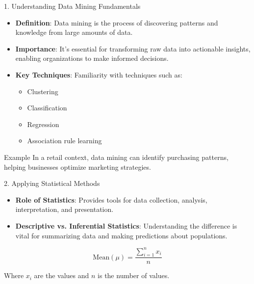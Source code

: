 \documentclass[aspectratio=169]{beamer}
\begin{document}
\begin{frame}[fragile]{1. Understanding Data Mining Fundamentals}
    \begin{itemize}
        \item \textbf{Definition}: Data mining is the process of discovering patterns and knowledge from large amounts of data.
        \item \textbf{Importance}: It's essential for transforming raw data into actionable insights, enabling organizations to make informed decisions.
        \item \textbf{Key Techniques}: Familiarity with techniques such as:
            \begin{itemize}
                \item Clustering
                \item Classification
                \item Regression
                \item Association rule learning
            \end{itemize}
    \end{itemize}
    
    \begin{block}{Example}
        In a retail context, data mining can identify purchasing patterns, helping businesses optimize marketing strategies.
    \end{block}
\end{frame}

\begin{frame}[fragile]{2. Applying Statistical Methods}
    \begin{itemize}
        \item \textbf{Role of Statistics}: Provides tools for data collection, analysis, interpretation, and presentation.
        \item \textbf{Descriptive vs. Inferential Statistics}: Understanding the difference is vital for summarizing data and making predictions about populations.
    \end{itemize}
    
    \begin{equation}
    \text{Mean} (\mu) = \frac{\sum_{i=1}^{n} x_i}{n}
    \end{equation}
    
    Where \( x_i \) are the values and \( n \) is the number of values.
\end{frame}
\end{document}
